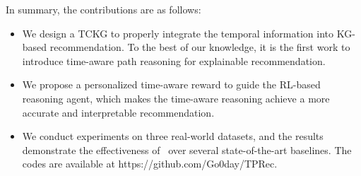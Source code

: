 %


In summary, the contributions are as follows:

\begin{itemize}
%
\item We design a TCKG to properly integrate the temporal information into 
KG-based recommendation.
To the best of our knowledge, it is the first work to 
introduce time-aware path reasoning
for explainable recommendation.

%

\item We propose a personalized time-aware reward to guide the RL-based 
reasoning agent,
which makes the time-aware reasoning achieve a
more accurate and interpretable  recommendation.

\item We conduct experiments on three real-world datasets, and the results 
demonstrate the effectiveness of \tkgrec\ over several state-of-the-art 
baselines. The codes are available at https://github.com/Go0day/TPRec.


\end{itemize}

